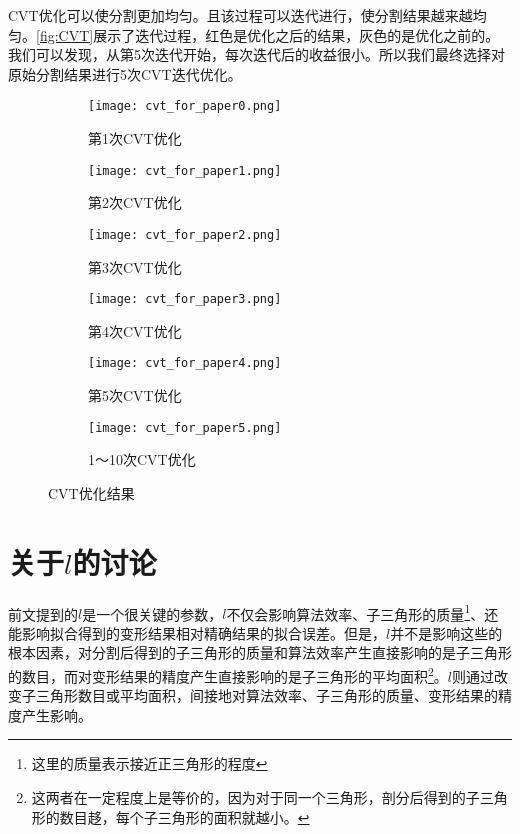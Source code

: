 CVT优化\cite{du1999}可以使分割更加均匀。且该过程可以迭代进行，使分割结果越来越均匀。\autoref{fig:CVT}展示了迭代过程，红色是优化之后的结果，灰色的是优化之前的。我们可以发现，从第5次迭代开始，每次迭代后的收益很小。所以我们最终选择对原始分割结果进行5次CVT迭代优化。

\begin{figure}[htbp]
	\centering
	\begin{subfigure}[b]{.49\textwidth}
		\centering
		\texttt{[image: cvt\_for\_paper0.png]}
		\caption{第1次CVT优化}
	\end{subfigure}
	\begin{subfigure}[b]{.49\textwidth}
		\centering
		\texttt{[image: cvt\_for\_paper1.png]}
		\caption{第2次CVT优化}
	\end{subfigure}

	\begin{subfigure}[b]{.49\textwidth}
		\centering
		\texttt{[image: cvt\_for\_paper2.png]}
		\caption{第3次CVT优化}
	\end{subfigure}
	\begin{subfigure}[b]{.49\textwidth}
		\centering
		\texttt{[image: cvt\_for\_paper3.png]}
		\caption{第4次CVT优化}
	\end{subfigure}

	\begin{subfigure}[b]{.49\textwidth}
		\centering
		\texttt{[image: cvt\_for\_paper4.png]}
		\caption{第5次CVT优化}
	\end{subfigure}
	\begin{subfigure}[b]{.49\textwidth}
		\centering
		\texttt{[image: cvt\_for\_paper5.png]}
		\caption{1～10次CVT优化}
	\end{subfigure}
    \caption{CVT优化结果} \label{fig:CVT}
\end{figure}

\section{关于$l$的讨论}
前文提到的$l$是一个很关键的参数，$l$不仅会影响算法效率、子三角形的质量\footnote{这里的质量表示接近正三角形的程度}、还能影响拟合得到的变形结果相对精确结果的拟合误差。但是，$l$并不是影响这些的根本因素，对分割后得到的子三角形的质量和算法效率产生直接影响的是子三角形的数目，而对变形结果的精度产生直接影响的是子三角形的平均面积\footnote{这两者在一定程度上是等价的，因为对于同一个三角形，剖分后得到的子三角形的数目趍，每个子三角形的面积就越小。}。$l$则通过改变子三角形数目或平均面积，间接地对算法效率、子三角形的质量、变形结果的精度产生影响。

